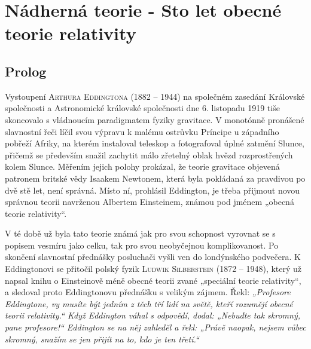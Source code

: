 \setchaptertoc
\chapter{Nádherná teorie - Sto let obecné teorie relativity}\label{feyIchIII}
\section{Prolog}\label{feyIchIIIsecI}
  Vystoupení \textsc{Arthura Eddingtona} (1882 – 1944) na společném zasedání Královské společnosti a
  Astronomické královské společnosti dne 6. listopadu 1919 tiše skoncovalo s vládnoucím paradigmatem
  fyziky gravitace. V monotónně pronášené slavnostní řeči líčil svou výpravu k malému ostrůvku
  Príncipe u západního pobřeží Afriky, na kterém instaloval teleskop a fotografoval úplné zatmění
  Slunce, přičemž se především snažil zachytit málo zřetelný oblak hvězd rozprostřených kolem
  Slunce. Měřením jejich polohy prokázal, že teorie gravitace objevená patronem britské vědy Isaakem
  Newtonem, která byla pokládaná za pravdivou po dvě stě let, není správná. Místo ní, prohlásil
  Eddington, je třeba přijmout novou správnou teorii navrženou Albertem Einsteinem, známou pod
  jménem „obecná teorie relativity“. 

  V té době už byla tato teorie známá jak pro svou schopnost vyrovnat se s popisem vesmíru jako
  celku, tak pro svou neobyčejnou komplikovanost. Po skončení slavnostní přednášky posluchači vyšli
  ven do londýnského podvečera. K Eddingtonovi se přitočil polský fyzik \textsc{Ludwik Silberstein}
  (1872 – 1948), který už napsal knihu o Einsteinově méně obecné teorii zvané „speciální teorie
  relativity“, a sledoval proto Eddingtonovu přednášku s velikým zájmem. Řekl: \emph{„Profesore
  Eddingtone, vy musíte být jedním z těch tří lidí na světě, kteří rozumějí obecné teorii
  relativity.“ Když Eddington váhal s odpovědí, dodal: „Nebuďte tak skromný, pane profesore!“
  Eddington se na něj zahleděl a řekl: „Právě naopak, nejsem vůbec skromný, snažím se jen přijít na
  to, kdo je ten třetí.“} 


